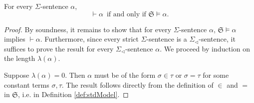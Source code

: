 \begin{theorem}
    \label{thm:stdModel.prf_iff_models}
    For every $\Sigma$-sentence $\alpha$, 
    $$
    \vdash \alpha \,\text{ if and only if } 
    \mathfrak{S} \vDash \alpha.
    $$
\end{theorem}

\begin{proof}
    By soundness, it remains to show that for every $\Sigma$-sentence $\alpha$,
    $\mathfrak{S} \vDash \alpha$ implies $\vdash \alpha$.
    Furthermore, since every strict $\Sigma$-sentence is a $\Sigma_{\lhd}$-sentence, 
    it suffices to prove the result for every $\Sigma_{\lhd}$-sentence $\alpha$.
    We proceed by induction on the length $\lambda (\alpha)$.

    Suppose $\lambda(\alpha) = 0$. Then $\alpha$ must be of the form $\sigma \in \tau$ or 
    $\sigma = \tau$ for some constant terms $\sigma, \tau$.
    The result follows directly from the definition of ${\in}$ and ${=}$ in $\mathfrak{S}$,
    i.e. in Definition \ref{def:stdModel}.


\end{proof}
